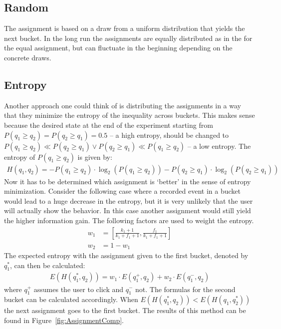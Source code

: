 \documentclass[../Thesis.tex]{subfiles}
\begin{document}
\subsection{Random}
The assignment is based on a draw from a uniform distribution that yields the next bucket. In the long run the assignments are equally distributed as in the for the equal assignment, but can fluctuate in the beginning depending on the concrete draws.

\subsection{Entropy}
Another approach one could think of is distributing the assignments in a way that they minimize the entropy of the inequality across buckets. This makes sense because the desired state at the end of the experiment starting from $P(q_1\geq q_2)=P(q_2\geq q_1)=0.5$ -- a high entropy, should be changed to $P(q_1\geq q_2)\ll P(q_2\geq q_1) \lor P(q_2\geq q_1)\ll P(q_1\geq q_2)$ -- a low entropy. The entropy of $P(q_1\geq q_2)$ is given by:
\begin{align*}
H(q_1,q_2) 	= - P(q_1\geq q_2) \cdot \log_2(P(q_1\geq q_2)) - P(q_2\geq q_1) \cdot \log_2(P(q_2\geq q_1))
\end{align*}
Now it has to be determined which assignment is `better' in the sense of entropy minimization. Consider the following case where a recorded event in a bucket would lead to a huge decrease in the entropy, but it is very unlikely that the user will actually show the behavior. In this case another assignment would still yield the higher information gain. The following factors are used to weight the entropy.
\begin{align*}
w_1 &=\left[\frac{k_1+1}{k_1+f_1+1},\frac{f_1}{k_1+f_1+1}\right] \\
w_2 &=1 - w_1
\end{align*}
The expected entropy with the assignment given to the first bucket, denoted by $q_1^*$, can then be calculated:
\begin{align*}
E(H(q_1^*,q_2)) = w_1\cdot E(q_1^+,q_2) + w_2\cdot E(q_1^-,q_2)
\end{align*}
where $q_1^+$ assumes the user to click and $q_1^-$ not. The formulas for the second bucket can be calculated accordingly. When $E(H(q_1^*,q_2)) < E(H(q_1,q_2^*))$ the next assignment goes to the first bucket. The results of this method can be found in Figure~\ref{fig:AssignmentComp}.
\end{document}
